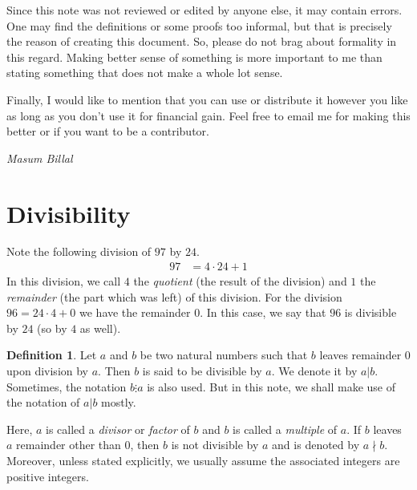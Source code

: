 \documentclass[a4paper, leqno]{article}
\theoremstyle{definition}
\newtheorem{definition}{Definition}
\theoremstyle{remark}
\begin{document}
		Since this note was not reviewed or edited by anyone else, it may contain errors. One may find the definitions or some proofs too informal, but that is precisely the reason of creating this document. So, please do not brag about formality in this regard. Making better sense of something is more important to me than stating something that does not make a whole lot sense.
		
		Finally, I would like to mention that you can use or distribute it however you like as long as you don't use it for financial gain. Feel free to email me for making this better or if you want to be a contributor.
			\begin{flushright}
				\slshape Masum Billal\\
				\date{October $10$, $2016$}
			\end{flushright}
		\newpage
	\section{Divisibility}
		Note the following division of $97$ by $24$.
			\begin{align*}
				97 & = 4\cdot24+1
			\end{align*}
		In this division, we call $4$ the \textit{quotient} (the result of the division) and $1$ the \textit{remainder} (the part which was left) of this division. For the division $96 = 24 · 4 + 0$ we have the remainder $0$. In this case, we say that $96$ is divisible by $24$ (so by $4$ as well).
			\begin{definition}
				Let $a$ and $b$ be two natural numbers such that $b$ leaves remainder $0$ upon division by $a$. Then $b$ is said to be divisible by $a$. We denote it by $a|b$. Sometimes, the notation $b\vdots a$ is also used. But in this note, we shall make use of the notation of $a|b$ mostly.
				
				Here, $a$ is called a \textit{divisor} or \textit{factor} of $b$ and $b$ is called a \textit{multiple} of $a$. If $b$ leaves $a$ remainder other than $0$, then $b$ is not divisible by $a$ and is denoted by $a\nmid b$. Moreover, unless stated explicitly, we usually assume the associated integers are positive integers.
			\end{definition}
			
\end{document}
